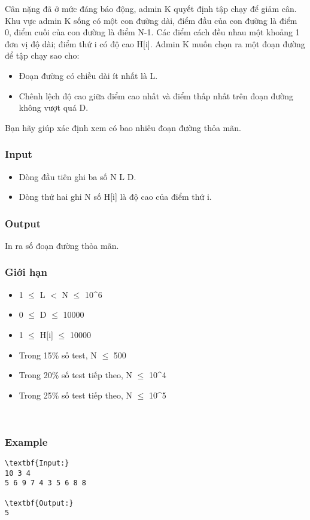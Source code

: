 

Cân nặng đã ở mức đáng báo động, admin K quyết định tập chạy để giảm cân. Khu vực admin K sống có một con đường dài, điểm đầu của con đường là điểm 0, điểm cuối của con đường là điểm N-1. Các điểm cách đều nhau một khoảng 1 đơn vị độ dài; điểm thứ i có độ cao H[i]. Admin K muốn chọn ra một đoạn đường để tập chạy sao cho:
\begin{itemize}
	\item Đoạn đường có chiều dài ít nhất là L.
	\item Chênh lệch độ cao giữa điểm cao nhất và điểm thấp nhất trên đoạn đường không vượt quá D.
\end{itemize}

Bạn hãy giúp xác định xem có bao nhiêu đoạn đường thỏa mãn.

\subsubsection{Input}
\begin{itemize}
	\item Dòng đầu tiên ghi ba số N L D.
	\item Dòng thứ hai ghi N số H[i] là độ cao của điểm thứ i.
\end{itemize}

\subsubsection{Output}

In ra số đoạn đường thỏa mãn.

\subsubsection{Giới hạn}
\begin{itemize}
	\item 1  $\le$  L $<$ N  $\le$  10^6
	\item 0  $\le$  D  $\le$  10000
	\item 1  $\le$  H[i]  $\le$  10000
	\item Trong 15\% số test, N  $\le$  500
	\item Trong 20\% số test tiếp theo, N  $\le$  10^4
	\item Trong 25\% số test tiếp theo, N  $\le$  10^5
\end{itemize}

 

\subsubsection{Example}
\begin{verbatim}
\textbf{Input:}
10 3 4
5 6 9 7 4 3 5 6 8 8

\textbf{Output:}
5\end{verbatim}
